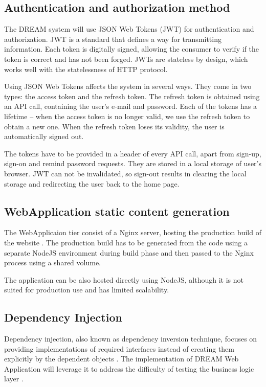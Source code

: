 \subsection{Authentication and authorization method}
The DREAM system will use JSON Web Tokens (JWT) \cite{jwt} for authentication and authorization. JWT is a standard that defines a way for transmitting information. Each token is digitally signed, allowing the consumer to verify if the token is correct and has not been forged. JWTs are stateless by design, which works well with the statelessness of HTTP protocol. 

Using JSON Web Tokens affects the system in several ways. They come in two types: the access token and the refresh token. The refresh token is obtained using an API call, containing the user's e-mail and password. Each of the tokens has a lifetime – when the access token is no longer valid, we use the refresh token to obtain a new one. When the refresh token loses its validity, the user is automatically signed out.

The tokens have to be provided in a header of every API call, apart from sign-up, sign-on and remind password requests. They are stored in a local storage of user's browser. JWT can not be invalidated, so sign-out results in clearing the local storage and redirecting the user back to the home page.

\subsection{WebApplication static content generation}
The WebApplicaion tier consist of a Nginx server, hosting the production build of the website \cite{react-production-build}. The production build has to be generated from the code using a separate NodeJS environment during build phase and then passed to the Nginx process using a shared volume.

The application can be also hosted directly using NodeJS, although it is not suited for production use and has limited scalability.

\subsection{Dependency Injection}\label{di-section}
Dependency injection, also known as dependency inversion technique, focuses on providing implementations of required interfaces instead of creating them explicitly by the dependent objects \cite{di}. The implementation of DREAM Web Application will leverage it to address the difficulty of testing the business logic layer \cites{ntier}.
